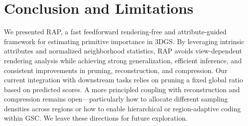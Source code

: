 \section{Conclusion and Limitations}
\label{sec:conclusion}
We presented RAP, a fast feedforward rendering-free and attribute-guided framework for estimating primitive importance in 3DGS. By leveraging intrinsic attributes and normalized neighborhood statistics, RAP avoids view-dependent rendering analysis while achieving strong generalization, efficient inference, and consistent improvements in pruning, reconstruction, and compression. Our current integration with downstream tasks relies on pruning a fixed global ratio based on predicted scores. A more principled coupling with reconstruction and compression remains open—particularly how to allocate different sampling densities across regions or how to enable hierarchical or region-adaptive coding within GSC. We leave these directions for future exploration.